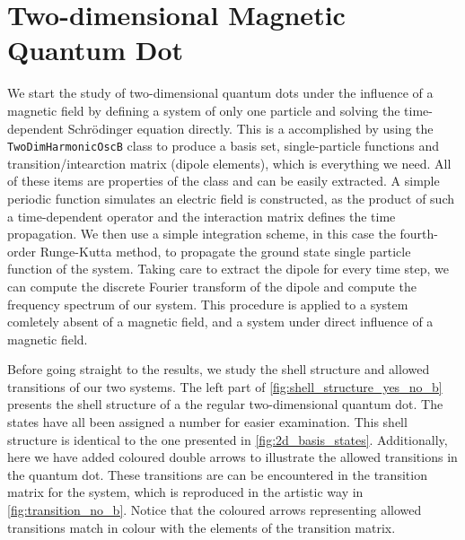\section{Two-dimensional Magnetic Quantum Dot}

We start the study of two-dimensional quantum dots under the influence of a magnetic 
field by defining a system of only one particle and solving the time-dependent 
Schrödinger equation
directly. This is a accomplished by using the \lstinline{TwoDimHarmonicOscB} class
to produce a basis set, single-particle functions and transition/intearction matrix (dipole elements),
which is everything we need. All of these items are properties of the class and can be
easily extracted. A simple periodic function simulates an electric field is constructed, as 
the product of such a time-dependent operator and the interaction matrix defines the 
time propagation. We then use a simple integration scheme, in this case the fourth-order 
Runge-Kutta method, to propagate the ground state single particle function of the system.
Taking care to extract the dipole for every time step, we can compute the discrete Fourier 
transform of the dipole and compute the frequency spectrum of our system. This procedure is 
applied to a system comletely absent of a magnetic field, and a system under direct influence 
of a magnetic field.

Before going straight to the results, we study the shell structure and allowed transitions of 
our two systems. The left part of \autoref{fig:shell_structure_yes_no_b} presents the 
shell structure of a the regular two-dimensional quantum dot. The states have all been assigned
a number for easier examination. This shell structure is 
identical to the one presented in \autoref{fig:2d_basis_states}. Additionally, here we have added
coloured double arrows to illustrate the allowed transitions in the quantum dot. These 
transitions are can be encountered in the transition matrix for the system, which is
reproduced in the artistic way in \autoref{fig:transition_no_b}. Notice that the coloured 
arrows representing allowed transitions match in colour with the elements of the transition 
matrix.

